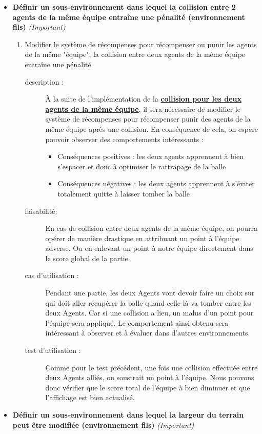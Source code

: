 \documentclass[11pt, a4paper]{article}
\newcommand{\besoinVItem}[5]{
	\item #1
	\begin{description}
		\item[description :]
		#2 
		\item[faisabilité: ]
		#3
		\item[cas d'utilisation :]
		#4
		\item[test d'utilisation :]      
		#5
	\end{description}
}
\begin{document}
\begin{itemize}
\begin{enumerate}
\end{enumerate}

\item \textbf {Définir un sous-environnement dans lequel la collision entre 2 agents de la même équipe entraîne une pénalité (environnement fils)} \textit{(Important)}
\begin{enumerate}
	\besoinVItem{Modifier le système de récompenses pour récompenser ou punir les agents de la même "équipe", la collision entre deux agents de la même équipe entraîne une pénalité}
	{ 
		À la suite de l'implémentation de la \hyperlink{link1}{\textbf{collision pour les deux agents de la même équipe}}, il sera nécessaire de modifier le système de récompenses pour récompenser
		 	punir des agents de la même équipe après une collision. En conséquence de cela, on espère pouvoir observer des comportements intéressants :

		\begin{itemize}
			\item Conséquences positives : les deux agents apprennent à bien s'espacer et donc à optimiser le rattrapage de la balle
			\item Conséquences négatives : les deux agents apprennent à s'éviter totalement quitte à laisser tomber la balle
		\end{itemize}

	}
	{

		En cas de collision entre deux agents de la même équipe, on pourra opérer de manière drastique en attribuant un point à l'équipe adverse. Ou en enlevant un point à notre équipe directement dans le score global de la partie.

	}
	{
        Pendant une partie, les deux Agents vont devoir faire un choix sur qui doit aller récupérer la balle quand celle-là va tomber entre les deux Agents. Car si une collision a lieu, un malus d'un point pour l'équipe sera appliqué. Le comportement ainsi obtenu sera intéressant à observer et à évaluer dans d'autres environnements.
	}
	{
        Comme pour le test précédent, une fois une collision effectuée entre deux Agents alliés, on soustrait un point à l'équipe. Nous pouvons donc vérifier que le score total de l'équipe à bien diminuer et que l'affichage est bien actualisé.
	} 
\end{enumerate}





\item \textbf {Définir un sous-environnement dans lequel la largeur du terrain peut être modifiée (environnement fils)} \textit{(Important)}


\end{itemize}
\end{document}
